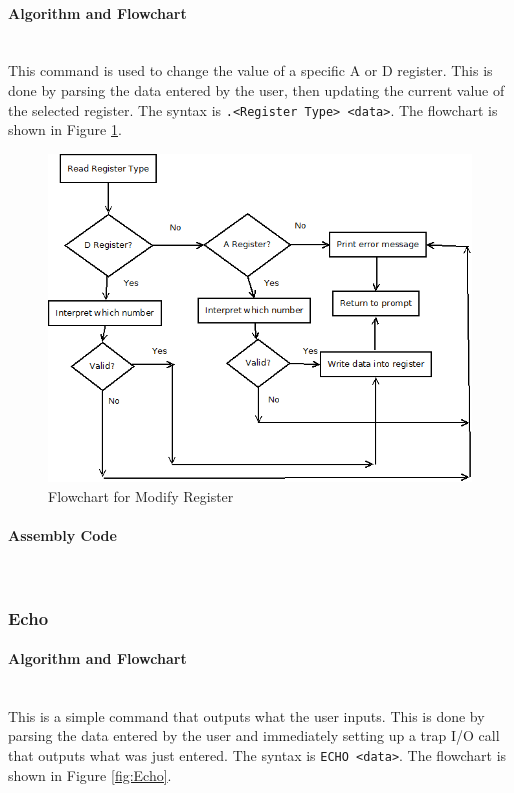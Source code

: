 \documentclass[12pt]{article}
\begin{document}
			\paragraph{Algorithm and Flowchart}~\\
				This command is used to change the value of a specific A or D register. This is done by parsing the data entered by the user, then updating the current value of the selected register. The syntax is \texttt{.<Register Type> <data>}. The flowchart is shown in Figure \ref{fig:ModifyReg}.
			
			
			
\begin{figure}[H]
\centering
\includegraphics[width=0.7\linewidth]{ModifyReg}
\caption{Flowchart for Modify Register}
\label{fig:ModifyReg}
\end{figure}
			\paragraph{Assembly Code}~\\				
			
			\subsubsection{Echo}
			\paragraph{Algorithm and Flowchart}~\\
			This is a simple command that outputs what the user inputs. This is done by parsing the data entered by the user and immediately setting up a trap I/O call that outputs what was just entered. The syntax is \texttt{ECHO <data>}. The flowchart is shown in Figure \ref{fig:Echo}.
\end{document}
